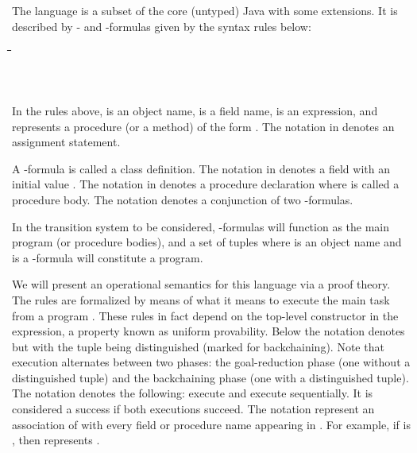 \documentclass[letter]{ieice}
\newenvironment{exmple}{
 \begingroup \begin{tabbing} \hspace{2em}\= \hspace{3em}\= \hspace{3em}\=
\hspace{3em}\= \hspace{3em}\= \hspace{3em}\= \kill}{
 \end{tabbing}\endgroup}
\begin{document}
The language is a subset of the core (untyped) Java
 with some extensions. It is described
by - and -formulas given by the syntax rules below:
\begin{exmple}
\> \>    \\   \\
\> \>  \\

\end{exmple}
\noindent
In the rules above,   is an object name,  is a field name,  is an expression, and
  represents a procedure (or a method) of the form .
The notation  in  denotes an assignment statement.

A -formula  is called a class definition. The notation
 in  denotes a field  with an initial
value . The notation
 in  denotes a procedure declaration where  is called a procedure body.
The notation  denotes a conjunction of two -formulas.

In the transition system to be considered, -formulas will function as the
main program (or procedure bodies), and a set of tuples  where  is an object
name and  is a -formula will constitute  a program.

 We will  present an operational
semantics for this language via a proof theory. The rules  are formalized by means of what
it means to
execute the main task  from a program .
These rules in fact depend on the top-level
constructor in the expression,  a property known as
uniform provability\cite{MNPS91}. Below the notation  denotes
 but with the  tuple being distinguished
(marked for backchaining). Note that execution  alternates between
two phases: the goal-reduction phase (one  without a distinguished tuple)
and the backchaining phase (one with a distinguished tuple).
The notation  denotes the following: execute  and execute
 sequentially. It is considered a success if both executions succeed.
The notation   represent an association of  with every field or procedure
name appearing in .
For example, if  is , then   represents  .
\end{document}
